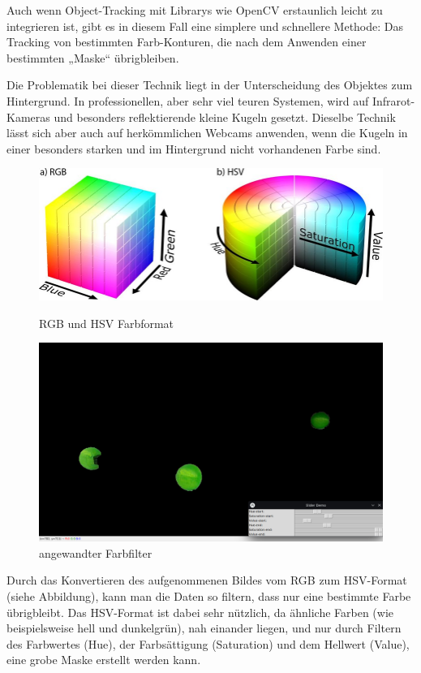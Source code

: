 \documentclass[12pt]{article}
\begin{document}
Auch wenn Object-Tracking mit Librarys wie OpenCV erstaunlich leicht zu integrieren ist, gibt es in diesem Fall eine simplere und schnellere Methode: Das Tracking von bestimmten Farb-Konturen, die nach dem Anwenden einer bestimmten „Maske“ übrigbleiben. 

Die Problematik bei dieser Technik liegt in der Unterscheidung des Objektes zum Hintergrund. In professionellen, aber sehr viel teuren Systemen, wird auf Infrarot-Kameras und besonders reflektierende kleine Kugeln gesetzt. Dieselbe Technik lässt sich aber auch auf herkömmlichen Webcams anwenden, wenn die Kugeln in einer besonders starken und im Hintergrund nicht vorhandenen Farbe sind. 

\begin{figure}
\centering
  \includegraphics[angle=0,width=\linewidth]{rgb-hsv.png}
  \caption{RGB und HSV Farbformat}
  {\setlength{\belowcaptionskip}{0pt}
    \includegraphics[angle=0,width=\linewidth]{2d-normal-filter.jpg}
    \caption{angewandter Farbfilter}
  }
\end{figure}
Durch das Konvertieren des aufgenommenen Bildes vom RGB zum HSV-Format (siehe Abbildung), kann man die Daten so filtern, dass nur eine bestimmte Farbe übrigbleibt. Das HSV-Format ist dabei sehr nützlich, da ähnliche Farben (wie beispielsweise hell und dunkelgrün), nah einander liegen, und nur durch Filtern des Farbwertes (Hue), der Farbsättigung (Saturation) und dem Hellwert (Value), eine grobe Maske erstellt werden kann. 
\end{document}
